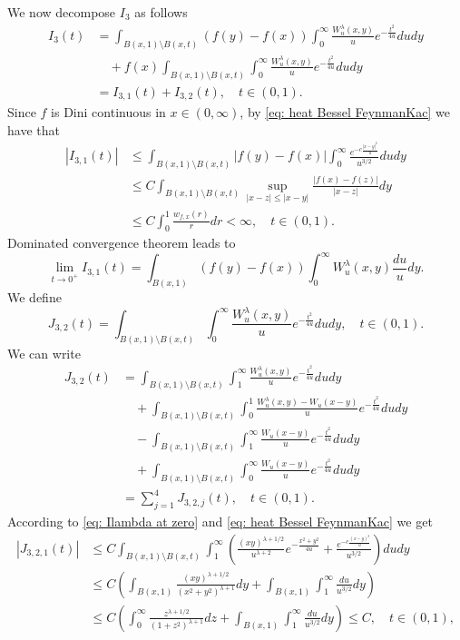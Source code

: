 \documentclass[a4paper,10pt, reqno]{amsart}
\theoremstyle{definition}
\theoremstyle{remark}
\numberwithin{equation}{section}
\begin{document}
We now decompose $I_3$ as follows
\begin{align*}
    I_3(t)&=
    \int_{B(x,1)\setminus B(x,t)}(f(y)-f(x))\int_0^\infty \frac{W_u^\lambda (x,y)}{u}e^{-\frac{t^2}{4u}}dudy\\
    &\quad +f(x)\int_{B(x,1)\setminus B(x,t)}\int_0^\infty \frac{W_u^\lambda (x,y)}{u}e^{-\frac{t^2}{4u}}dudy\\
    &=I_{3,1}(t)+I_{3,2}(t),\quad t\in (0,1).
\end{align*}
Since $f$ is Dini continuous in $x\in (0,\infty)$, by \eqref{eq: heat Bessel FeynmanKac} we have that 
\begin{align*}
    |I_{3,1}(t)|&\le \int_{B(x,1)\setminus B(x,t)}|f(y)-f(x)|\int_0^\infty \frac{e^{-c\frac{|x-y|^2}{u}}}{u^{3/2}}dudy\\
    &\le C\int_{B(x,1)\setminus B(x,t)}\sup_{|x-z|\le|x-y|}\frac{|f(x)-f(z)|}{|x-z|}dy\\
    &\le C\int_0^1\frac{w_{f,x}(r)}{r}dr<\infty,\quad t\in (0,1).
\end{align*}
Dominated convergence theorem leads to
\[
\lim_{t\rightarrow 0^+}I_{3,1}(t)=\int_{B(x,1)}(f(y)-f(x))\int_0^\infty W_u^\lambda (x,y)\frac{du}{u}dy.
\]
We define 
\[
J_{3,2}(t)=\int_{B(x,1)\setminus B(x,t)}\int_0^\infty \frac{W_u^\lambda (x,y)}{u}e^{-\frac{t^2}{4u}}dudy,\quad t\in (0,1).
\]
We can write
\begin{align*}
J_{3,2}(t)&=\int_{B(x,1)\setminus B(x,t)}\int_1^\infty \frac{W_u^\lambda (x,y)}{u}e^{-\frac{t^2}{4u}}dudy\\
&\quad +\int_{B(x,1)\setminus B(x,t)}\int_0^1 \frac{W_u^\lambda (x,y)-W_u(x-y)}{u}e^{-\frac{t^2}{4u}}dudy \\
&\quad -\int_{B(x,1)\setminus B(x,t)}\int_1^\infty \frac{W_u(x-y)}{u}e^{-\frac{t^2}{4u}}dudy\\
&\quad +\int_{B(x,1)\setminus B(x,t)}\int_0^\infty \frac{W_u(x-y)}{u}e^{-\frac{t^2}{4u}}dudy\\
&=\sum_{j=1}^4J_{3,2,j}(t),\quad t\in (0,1).
\end{align*}
According to \eqref{eq: Ilambda at zero} and \eqref{eq: heat Bessel FeynmanKac} we get 
\begin{align*}
    |J_{3,2,1}(t)|&\leq C\int_{B(x,1)\setminus B(x,t)}\int_1^\infty \left(\frac{(xy)^{\lambda+1/2}}{u^{\lambda +2}}e^{-\frac{x^2+y^2}{4u}}+\frac{e^{-c\frac{(x-y)^2}{u}}}{u^{3/2}}\right)dudy\\
    &\leq C\left(\int_{B(x,1)}\frac{(xy)^{\lambda+1/2}}{(x^2+y^2)^{\lambda +1}}dy+\int_{B(x,1)}\int_1^\infty \frac{du}{u^{3/2}}dy\right)\\
    &\leq C\left(\int_{0}^\infty \frac{z^{\lambda+1/2}}{(1+z^2)^{\lambda +1}}dz+\int_{B(x,1)}\int_1^\infty \frac{du}{u^{3/2}}dy\right)\leq C,\quad t\in (0,1),
\end{align*}
\end{document}
